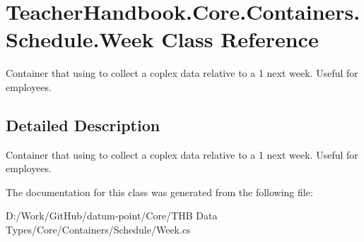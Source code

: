 \hypertarget{class_teacher_handbook_1_1_core_1_1_containers_1_1_schedule_1_1_week}{}\section{Teacher\+Handbook.\+Core.\+Containers.\+Schedule.\+Week Class Reference}
\label{class_teacher_handbook_1_1_core_1_1_containers_1_1_schedule_1_1_week}


Container that using to collect a coplex data relative to a 1 next week. Useful for employees.  




\subsection{Detailed Description}
Container that using to collect a coplex data relative to a 1 next week. Useful for employees. 



The documentation for this class was generated from the following file\+:\begin{DoxyCompactItemize}
\item 
D\+:/\+Work/\+Git\+Hub/datum-\/point/\+Core/\+T\+H\+B Data Types/\+Core/\+Containers/\+Schedule/Week.\+cs\end{DoxyCompactItemize}

